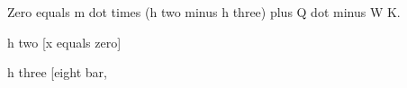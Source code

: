 Zero equals m dot times (h two minus h three) plus Q dot minus W K.  

h two [x equals zero]  

h three [eight bar,